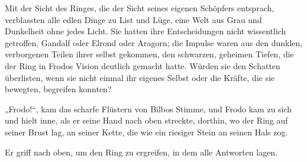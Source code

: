 Mit der Sicht des Ringes, die der Sicht seines eigenen Schöpfers entsprach, verblassten alle edlen Dinge zu List und Lüge, eine Welt aus Grau und Dunkelheit ohne jedes Licht. Sie hatten ihre Entscheidungen nicht wissentlich getroffen, Gandalf oder Elrond oder Aragorn; die Impulse waren aus den dunklen, verborgenen Teilen ihrer selbst gekommen, den schwarzen, geheimen Tiefen, die der Ring in Frodos Vision deutlich gemacht hatte. Würden sie den Schatten überlisten, wenn sie nicht einmal ihr eigenes Selbst oder die Kräfte, die sie bewegten, begreifen konnten?

„Frodo!“, kam das scharfe Flüstern von Bilbos Stimme, und Frodo kam zu sich und hielt inne, als er seine Hand nach oben streckte, dorthin, wo der Ring auf seiner Brust lag, an seiner Kette, die wie ein riesiger Stein an seinen Hals zog.

Er griff nach oben, um den Ring zu ergreifen, in dem alle Antworten lagen.

